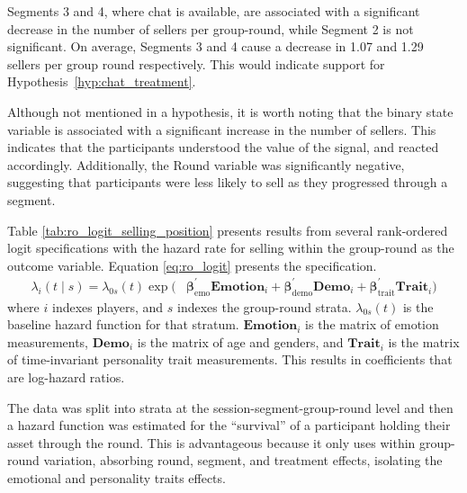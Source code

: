 \documentclass[thesis]{uathesis}
\begin{document}
\begin{body}
Segments 3 and 4, where chat is available, are associated with a significant decrease in the number of sellers per group-round, while Segment 2 is not significant. On average, Segments 3 and 4 cause a decrease in 1.07 and 1.29 sellers per group round respectively. This would indicate support for Hypothesis~\ref{hyp:chat_treatment}.


Although not mentioned in a hypothesis, it is worth noting that the binary state variable is associated with a significant increase in the number of sellers. This indicates that the participants understood the value of the signal, and reacted accordingly. Additionally, the Round variable was significantly negative, suggesting that participants were less likely to sell as they progressed through a segment.

Table \ref{tab:ro_logit_selling_position} presents results from several rank-ordered logit specifications with the hazard rate for selling within the group-round as the outcome variable. Equation \ref{eq:ro_logit} presents the specification.
  \begin{equation}
  \begin{split}
      \lambda_i(t \mid s) = \lambda_{0s}(t) \exp\bigl(
      & \boldsymbol{\beta}_{\text{emo}}^{\prime} \mathbf{Emotion}_i + \boldsymbol{\beta}_{\text{demo}}^{\prime} \mathbf{Demo}_i  + \boldsymbol{\beta}_{\text{trait}}^{\prime} \mathbf{Trait}_i \bigr)
  \end{split}
  \label{eq:ro_logit}
  \end{equation}
where $i$ indexes players, and $s$ indexes the group-round strata. $\lambda_{0s}(t)$ is the baseline hazard function for that stratum. $\mathbf{Emotion}_i$ is the matrix of emotion measurements, $\mathbf{Demo}_i$ is the matrix of age and genders, and $\mathbf{Trait}_i$ is the matrix of time-invariant personality trait measurements. This results in coefficients that are log-hazard ratios.

The data was split into strata at the session-segment-group-round level and then a hazard function was estimated for the ``survival'' of a participant holding their asset through the round. This is advantageous because it only uses within group-round variation, absorbing round, segment, and treatment effects, isolating the emotional and personality traits effects.


\end{body}
\end{document}
